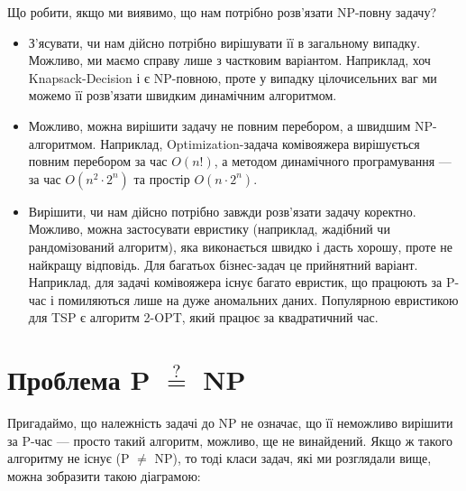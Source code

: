 \documentclass[12pt,a4paper]{report}
\begin{document}
Що робити, якщо ми виявимо, що нам потрібно розв’язати NP-повну задачу?

\begin{itemize}
    \item З’ясувати, чи нам дійсно потрібно вирішувати її в загальному випадку. Можливо, ми маємо справу лише з частковим варіантом. Наприклад, хоч Knapsack-Decision і є NP-повною, проте у випадку цілочисельних ваг ми можемо її розв’язати швидким динамічним алгоритмом.
    \item Можливо, можна вирішити задачу не повним перебором, а швидшим NP-алгоритмом. Наприклад, Optimization-задача комівояжера вирішується повним перебором за час \(O(n!)\), а методом динамічного програмування --- за час \(O(n ^ 2 \cdot 2 ^ n)\) та простір \(O(n \cdot 2 ^ n)\).
    \item Вирішити, чи нам дійсно потрібно завжди розв’язати задачу коректно. Можливо, можна застосувати евристику (наприклад, жадібний чи рандомізований алгоритм), яка виконається швидко і дасть хорошу, проте не найкращу відповідь. Для багатьох бізнес-задач це прийнятний варіант. Наприклад, для задачі комівояжера існує багато евристик, що працюють за P-час і помиляються лише на дуже аномальних даних. Популярною евристикою для TSP є алгоритм 2-OPT, який працює за квадратичний час.
\end{itemize}



\section{Проблема P \(\stackrel{?}{=}\) NP}

Пригадаймо, що належність задачі до NP не означає, що її неможливо вирішити за P-час --- просто такий алгоритм, можливо, ще не винайдений. Якщо ж такого алгоритму не існує (P \(\neq\) NP), то тоді класи задач, які ми розглядали вище, можна зобразити такою діаграмою:

\begin{center}
\end{center}
\end{document}
